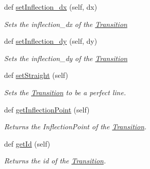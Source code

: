 \begin{DoxyCompactItemize}
def \mbox{\hyperlink{classTransition_1_1Transition_a90073d47fc1267a92dc9ae9638c0f2d3}{set\+Inflection\+\_\+dx}} (self, dx)
\begin{DoxyCompactList}\small\item\em Sets the inflection\+\_\+dx of the \mbox{\hyperlink{classTransition_1_1Transition}{Transition}}   \end{DoxyCompactList}\item 
def \mbox{\hyperlink{classTransition_1_1Transition_a45a43d47163d7809870bfe7eb0e7613b}{set\+Inflection\+\_\+dy}} (self, dy)
\begin{DoxyCompactList}\small\item\em Sets the inflection\+\_\+dy of the \mbox{\hyperlink{classTransition_1_1Transition}{Transition}}   \end{DoxyCompactList}\item 
\mbox{\label{classTransition_1_1Transition_a4e4b51ebea138330b6cf26b2d60259e6}} 
def \mbox{\hyperlink{classTransition_1_1Transition_a4e4b51ebea138330b6cf26b2d60259e6}{set\+Straight}} (self)
\begin{DoxyCompactList}\small\item\em Sets the \mbox{\hyperlink{classTransition_1_1Transition}{Transition}} to be a perfect line. \end{DoxyCompactList}\item 
def \mbox{\hyperlink{classTransition_1_1Transition_a694845bc683f2e6143b8b8678ee2d5ce}{get\+Inflection\+Point}} (self)
\begin{DoxyCompactList}\small\item\em Returns the Inflection\+Point of the \mbox{\hyperlink{classTransition_1_1Transition}{Transition}}. \end{DoxyCompactList}\item 
\mbox{\label{classTransition_1_1Transition_ae6277bcf4aea2296985047ec15bc62f0}} 
def \mbox{\hyperlink{classTransition_1_1Transition_ae6277bcf4aea2296985047ec15bc62f0}{get\+Id}} (self)
\begin{DoxyCompactList}\small\item\em Returns the id of the \mbox{\hyperlink{classTransition_1_1Transition}{Transition}}. \end{DoxyCompactList}\item 
\mbox{\label{classTransition_1_1Transition_a7f15a09e38c42960fbf122eef511f11b}} 

\end{DoxyCompactItemize}
